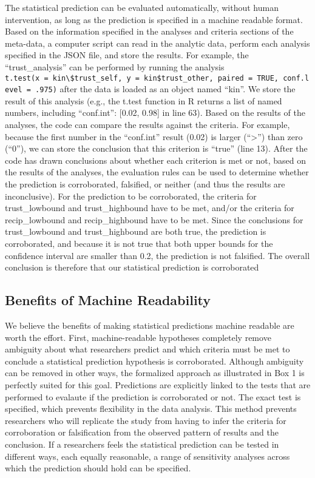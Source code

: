 \documentclass[english,doc,floatsintext]{apa6}
\begin{document}
The statistical prediction can be evaluated automatically, without human intervention, as long as the prediction is specified in a machine readable format. Based on the information specified in the analyses and criteria sections of the meta-data, a computer script can read in the analytic data, perform each analysis specified in the JSON file, and store the results. For example, the \enquote{trust\_analysis} can be performed by running the analysis \texttt{t.test(x\ =\ kin\textbackslash{}\$trust\_self,\ y\ =\ kin\$trust\_other,\ paired\ =\ TRUE,\ conf.level\ =\ .975)} after the data is loaded as an object named \enquote{kin}. We store the result of this analysis (e.g., the t.test function in R returns a list of named numbers, including \enquote{conf.int}: {[}0.02, 0.98{]} in line 63). Based on the results of the analyses, the code can compare the results against the criteria. For example, because the first number in the \enquote{conf.int} result (0.02) is larger (\enquote{\textgreater{}}) than zero (\enquote{0}), we can store the conclusion that this criterion is \enquote{true} (line 13). After the code has drawn conclusions about whether each criterion is met or not, based on the results of the analyses, the evaluation rules can be used to determine whether the prediction is corroborated, falsified, or neither (and thus the results are inconclusive). For the prediction to be corroborated, the criteria for trust\_lowbound and trust\_highbound have to be met, and/or the criteria for recip\_lowbound and recip\_highbound have to be met. Since the conclusions for trust\_lowbound and trust\_highbound are both true, the prediction is corroborated, and because it is not true that both upper bounds for the confidence interval are smaller than 0.2, the prediction is not falsified. The overall conclusion is therefore that our statistical prediction is corroborated

\hypertarget{benefits-of-machine-readability}{%
\subsection{Benefits of Machine Readability}\label{benefits-of-machine-readability}}

We believe the benefits of making statistical predictions machine readable are worth the effort. First, machine-readable hypotheses completely remove ambiguity about what researchers predict and which criteria must be met to conclude a statistical prediction hypothesis is corroborated. Although ambiguity can be removed in other ways, the formalized approach as illustrated in Box 1 is perfectly suited for this goal. Predictions are explicitly linked to the tests that are performed to evalaute if the prediction is corroborated or not. The exact test is specified, which prevents flexibility in the data analysis. This method prevents researchers who will replicate the study from having to infer the criteria for corroboration or falsification from the observed pattern of results and the conclusion. If a researchers feels the statistical prediction can be tested in different ways, each equally reasonable, a range of sensitivity analyses across which the prediction should hold can be specified.
\end{document}
